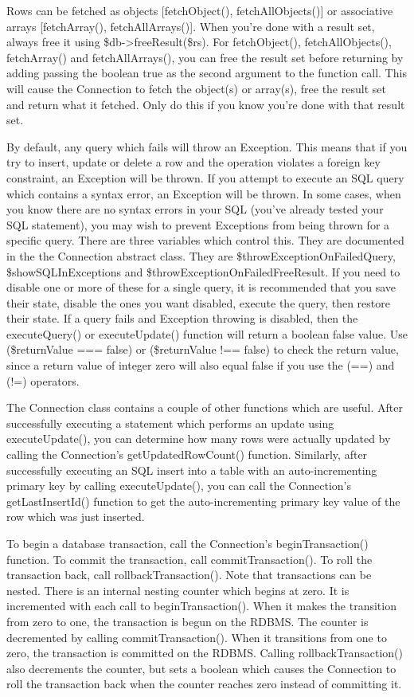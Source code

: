 \documentclass[letterpaper,10pt,english]{sphinxmanual}
\begin{document}
Rows can be fetched as objects {[}fetchObject(), fetchAllObjects(){]} or associative arrays
{[}fetchArray(), fetchAllArrays(){]}.  When you're done with a result set, always free it using
\$db-\textgreater{}freeResult(\$rs).  For fetchObject(), fetchAllObjects(), fetchArray() and fetchAllArrays(), you
can free the result set before returning by adding passing the boolean true as the second argument
to the function call.  This will cause the Connection to fetch the object(s) or array(s), free the
result set and return what it fetched.  Only do this if you know you're done with that result set.

By default, any query which fails will throw an Exception.  This means that if you try to insert,
update or delete a row and the operation violates a foreign key constraint, an Exception will be
thrown.  If you attempt to execute an SQL query which contains a syntax error, an Exception will be
thrown.  In some cases, when you know there are no syntax errors in your SQL (you've already tested
your SQL statement), you may wish to prevent Exceptions from being thrown for a specific query.
There are three variables which control this.  They are documented in the the Connection abstract
class.  They are \$throwExceptionOnFailedQuery, \$showSQLInExceptions and
\$throwExceptionOnFailedFreeResult.  If you need to disable one or more of these for a single query,
it is recommended that you save their state, disable the ones you want disabled, execute the query,
then restore their state.  If a query fails and Exception throwing is disabled, then the
executeQuery() or executeUpdate() function will return a boolean false value.  Use (\$returnValue ===
false) or (\$returnValue !== false) to check the return value, since a return value of integer zero
will also equal false if you use the (==) and (!=) operators.

The Connection class contains a couple of other functions which are useful.  After successfully
executing a statement which performs an update using executeUpdate(), you can determine how many
rows were actually updated by calling the Connection's getUpdatedRowCount() function.  Similarly,
after successfully executing an SQL insert into a table with an auto-incrementing primary key by
calling executeUpdate(), you can call the Connection's getLastInsertId() function to get the
auto-incrementing primary key value of the row which was just inserted.

To begin a database transaction, call the Connection's beginTransaction() function.  To commit the
transaction, call commitTransaction().  To roll the transaction back, call rollbackTransaction().
Note that transactions can be nested.  There is an internal nesting counter which begins at zero.
It is incremented with each call to beginTransaction().  When it makes the transition from zero to
one, the transaction is begun on the RDBMS.  The counter is decremented by calling
commitTransaction().  When it transitions from one to zero, the transaction is committed on the
RDBMS.  Calling rollbackTransaction() also decrements the counter, but sets a boolean which causes
the Connection to roll the transaction back when the counter reaches zero instead of committing it.
\end{document}
